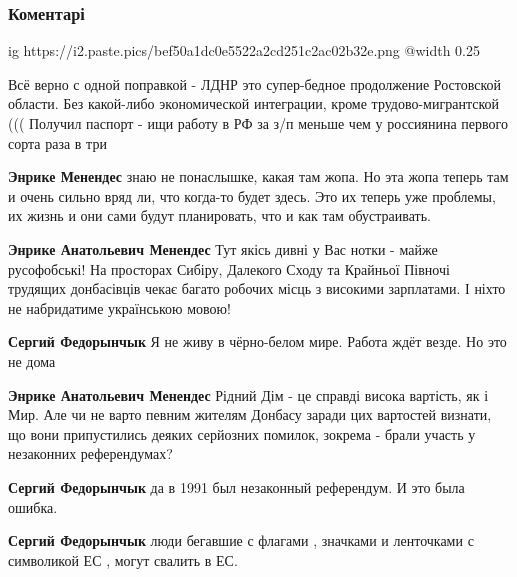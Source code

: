  
 
 
 
 
\subsubsection{Коментарі}

\begin{itemize} %

\ifcmt
  ig https://i2.paste.pics/bef50a1dc0e5522a2cd251c2ac02b32e.png
  @width 0.25
\fi


Всё верно с одной поправкой - ЛДНР это супер-бедное продолжение Ростовской
области. Без какой-либо экономической интеграции, кроме трудово-мигрантской (((
Получил паспорт - ищи работу в РФ за з/п меньше чем у россиянина первого сорта
раза в три

\begin{itemize} %
\textbf{Энрике Менендес} знаю не понаслышке, какая там жопа. Но эта жопа теперь там и очень сильно вряд ли, что когда-то будет здесь. Это их теперь уже проблемы, их жизнь и они сами будут планировать, что и как там обустраивать.

\textbf{Энрике Анатольевич Менендес} Тут якісь дивні у Вас нотки - майже русофобські! На просторах Сибіру, Далекого Сходу та Крайньої Півночі трудящих донбасівців чекає багато робочих місць з високими зарплатами. І ніхто не набридатиме українською мовою!

\textbf{Сергий Федорынчык} Я не живу в чёрно-белом мире. Работа ждёт везде. Но это не дома

\textbf{Энрике Анатольевич Менендес} Рідний Дім - це справді висока вартість, як і Мир. Але чи не варто певним жителям Донбасу заради цих вартостей визнати, що вони припустились деяких серйозних помилок, зокрема - брали участь у незаконних референдумах?

\textbf{Сергий Федорынчык} да в 1991 был незаконный референдум. И это была ошибка.

\textbf{Сергий Федорынчык} люди бегавшие с флагами , значками и ленточками с символикой ЕС , могут свалить в ЕС.


\end{itemize}
\end{itemize}

